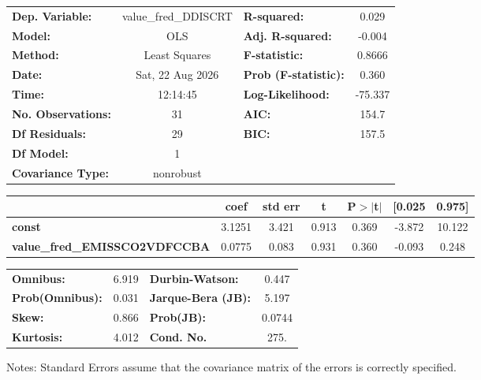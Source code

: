 \begin{center}
\begin{tabular}{lclc}
\toprule
\textbf{Dep. Variable:}               & value\_fred\_DDISCRT & \textbf{  R-squared:         } &     0.029   \\
\textbf{Model:}                       &         OLS          & \textbf{  Adj. R-squared:    } &    -0.004   \\
\textbf{Method:}                      &    Least Squares     & \textbf{  F-statistic:       } &    0.8666   \\
\textbf{Date:}                        &   Sat, 22 Aug 2026   & \textbf{  Prob (F-statistic):} &    0.360    \\
\textbf{Time:}                        &       12:14:45       & \textbf{  Log-Likelihood:    } &   -75.337   \\
\textbf{No. Observations:}            &            31        & \textbf{  AIC:               } &     154.7   \\
\textbf{Df Residuals:}                &            29        & \textbf{  BIC:               } &     157.5   \\
\textbf{Df Model:}                    &             1        & \textbf{                     } &             \\
\textbf{Covariance Type:}             &      nonrobust       & \textbf{                     } &             \\
\bottomrule
\end{tabular}
\begin{tabular}{lcccccc}
                                      & \textbf{coef} & \textbf{std err} & \textbf{t} & \textbf{P$> |$t$|$} & \textbf{[0.025} & \textbf{0.975]}  \\
\midrule
\textbf{const}                        &       3.1251  &        3.421     &     0.913  &         0.369        &       -3.872    &       10.122     \\
\textbf{value\_fred\_EMISSCO2VDFCCBA} &       0.0775  &        0.083     &     0.931  &         0.360        &       -0.093    &        0.248     \\
\bottomrule
\end{tabular}
\begin{tabular}{lclc}
\textbf{Omnibus:}       &  6.919 & \textbf{  Durbin-Watson:     } &    0.447  \\
\textbf{Prob(Omnibus):} &  0.031 & \textbf{  Jarque-Bera (JB):  } &    5.197  \\
\textbf{Skew:}          &  0.866 & \textbf{  Prob(JB):          } &   0.0744  \\
\textbf{Kurtosis:}      &  4.012 & \textbf{  Cond. No.          } &     275.  \\
\bottomrule
\end{tabular}
\end{center}

Notes: \newline
 [1] Standard Errors assume that the covariance matrix of the errors is correctly specified.